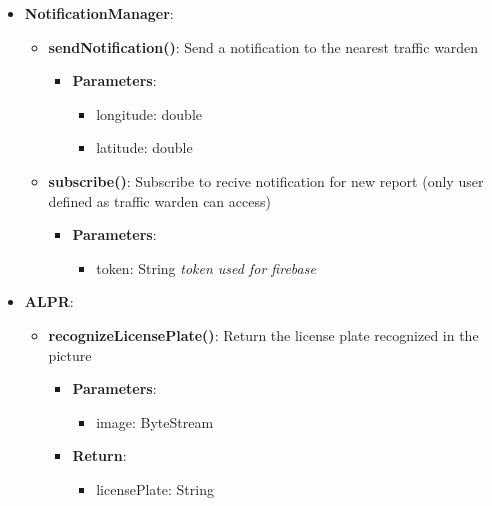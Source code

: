 \documentclass{article}
\begin{document}
\begin{itemize}
\begin{itemize}
\begin{itemize}
\begin{itemize}
						\end{itemize}
					\item \textbf{Return}:
						\begin{itemize}
							\item ranking: List\textlangle{}String\textrangle{} \textit{ordered list of license plate}
						\end{itemize}
				\end{itemize}	
		\end{itemize}
	\item \textbf{NotificationManager}:
		\begin{itemize}
			\item \textbf{sendNotification()}:
				Send a notification to the nearest traffic warden
				\begin{itemize}
					\item \textbf{Parameters}:
						\begin{itemize}
							\item longitude: double
							\item latitude: double
						\end{itemize}
				\end{itemize}
			\item \textbf{subscribe()}:
			Subscribe to recive notification for new report (only user defined as traffic warden can access)
				\begin{itemize}
					\item \textbf{Parameters}:
						\begin{itemize}
							\item token: String \textit{token used for firebase}
						\end{itemize}
				\end{itemize}
			\end{itemize}
	\item \textbf{ALPR}:
		\begin{itemize}
			\item \textbf{recognizeLicensePlate()}:
			Return the license plate recognized in the picture
				\begin{itemize}
					\item \textbf{Parameters}:
						\begin{itemize}
							\item image: ByteStream
						\end{itemize}
					\item \textbf{Return}:
						\begin{itemize}
							\item licensePlate: String

\end{itemize}
\end{itemize}
\end{itemize}
\end{itemize}
\end{document}
